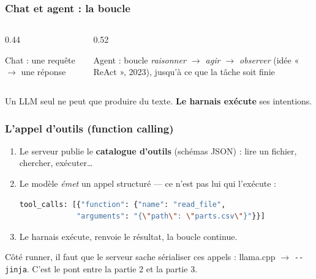 \documentclass[
	11pt,
	aspectratio=169
]{beamer}
\begin{document}
\begin{frame}
    \frametitle{Chat et agent : la boucle}
    \begin{columns}[c]
        \begin{column}{0.44\textwidth}
            \centering
            \small Chat : une requête $\rightarrow$ une réponse
        \end{column}
        \begin{column}{0.52\textwidth}
            \centering
            \small Agent : boucle \emph{raisonner $\rightarrow$ agir $\rightarrow$ observer} (idée « ReAct », 2023), jusqu'à ce que la tâche soit finie
        \end{column}
    \end{columns}
    \vfill
    \begin{center}
        Un LLM seul ne peut que produire du texte. \textbf{Le harnais exécute} ses intentions.
    \end{center}
\end{frame}

\begin{frame}[fragile]
    \frametitle{L'appel d'outils (function calling)}
    \begin{enumerate}\setlength\itemsep{0.4em}
        \item Le serveur publie le \textbf{catalogue d'outils} (schémas JSON) : lire un fichier, chercher, exécuter\dots
        \item Le modèle \emph{émet} un appel structuré --- ce n'est pas lui qui l'exécute :
\begin{lstlisting}[language=bash]
tool_calls: [{"function": {"name": "read_file",
             "arguments": "{\"path\": \"parts.csv\"}"}}]
\end{lstlisting}
        \item Le harnais exécute, renvoie le résultat, la boucle continue.
    \end{enumerate}
    \vfill
    \begin{alertblock}{}
        Côté runner, il faut que le serveur sache sérialiser ces appels : llama.cpp $\rightarrow$ \texttt{-\/-jinja}. C'est le pont entre la partie 2 et la partie 3.
    \end{alertblock}
\end{frame}
\end{document}

